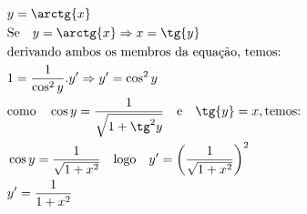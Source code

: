 \begin{ex}
\begin{align}
&y=\arctg{x}\nonumber\\
&\text{Se}\quad y=\arctg{x} \Rightarrow x=\tg{y}\nonumber\\
&\text{derivando ambos os membros da equação, temos:}\nonumber\\
&1=\frac{1}{\cos^2{y}}.y' \Rightarrow y'=\cos^2{y}\nonumber\\
&\text{como}\quad \cos{y}=\frac{1}{\sqrt{1+\tg^2{y}}}\quad \text{e}\quad \tg{y}=x, \text{temos:}\nonumber\\
&\cos{y}=\frac{1}{\sqrt{1+x^2}}\quad \text{logo}\quad y'=\left(\frac{1}{\sqrt{1+x^2}}\right)^2\nonumber\\
&y'=\frac{1}{1+x^2}\nonumber
\end{align}
\end{ex}